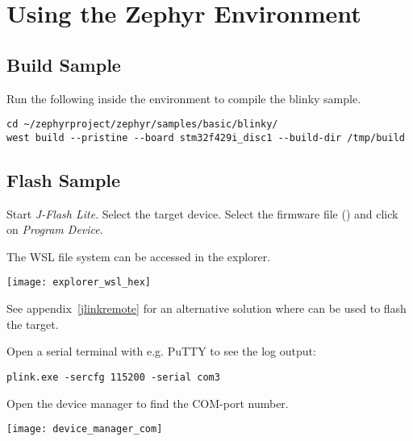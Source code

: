 \newpage

\section{Using the Zephyr Environment}

\subsection{Build Sample}

Run the following inside the environment to compile the blinky sample.

\begin{lstlisting}
cd ~/zephyrproject/zephyr/samples/basic/blinky/
west build --pristine --board stm32f429i_disc1 --build-dir /tmp/build
\end{lstlisting}


\subsection{Flash Sample}

Start \emph{J-Flash Lite}. Select the target device. Select the firmware file
() and click on \emph{Program Device}.


\begin{infobox}
  The WSL file system can be accessed in the explorer.
  \begin{center}
    \texttt{[image: explorer\_wsl\_hex]}
  \end{center}
\end{infobox}

See appendix~\ref{jlinkremote} for an alternative solution where  can be used to flash the target.

Open a serial terminal with e.g. PuTTY to see the log output:

\begin{lstlisting}
plink.exe -sercfg 115200 -serial com3
\end{lstlisting}

\begin{infobox}
  Open the device manager to find the COM-port number.
  \begin{center}
    \texttt{[image: device\_manager\_com]}
  \end{center}
\end{infobox}

